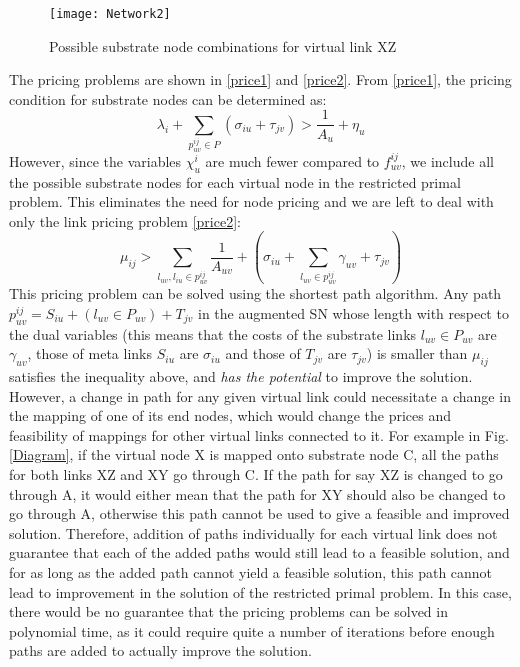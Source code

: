 \documentclass[journal]{IEEEtran}
\begin{document}
\begin{figure}[t]
  {\texttt{[image: Network2]}}
  \caption{Possible substrate node combinations for virtual link XZ}
  \label{Diagram2}
\end{figure}

The pricing problems are shown in \eqref{price1} and \eqref{price2}. From \eqref{price1}, the pricing condition for substrate nodes can be determined as: $$\lambda_i + \sum \limits_{p_{uv}^{ij} \in P} (\sigma_{iu} + \tau_{jv}) > \frac{1}{A_{u}} + \eta_u$$
 However, since the variables $\chi_{u}^{i}$ are much fewer compared to $f_{uv}^{ij}$, we include all the possible substrate nodes for each virtual node in the restricted primal problem. This eliminates the need for node pricing and we are left to deal with only the link pricing problem \eqref{price2}: $$\mu_{ij} > \sum \limits_{ l_{uv}, l_{iu}\in p_{uv}^{ij}} \frac{1}{A_{uv}} + (\sigma_{iu} + \sum \limits_{l_{uv} \in p_{uv}^{ij}}\gamma_{uv} +  \tau_{jv})$$
This pricing problem can be solved using the shortest path algorithm. Any path $p_{uv}^{ij} = S_{iu} + (l_{uv} \in P_{uv}) + T_{jv}$ in the augmented \ac{SN} whose length with respect to the dual variables (this means that the costs of the substrate links $l_{uv} \in P_{uv}$ are $\gamma_{uv}$, those of meta links $S_{iu}$ are $\sigma_{iu}$ and those of $T_{jv}$ are $\tau_{jv}$) is smaller than $\mu_{ij}$ satisfies the inequality above, and \emph{has the potential} to improve the solution.
However, a change in path for any given virtual link could necessitate a change in the mapping of one of its end nodes, which would change the prices and feasibility of mappings for other virtual links connected to it. For example in Fig. \ref{Diagram}, if the virtual node X is mapped onto substrate node C, all the paths for both links XZ and XY go through C. If the path for say XZ is changed to go through A, it would either mean that the path for XY should also be changed to go through A, otherwise this path cannot be used to give a feasible and improved solution. Therefore, addition of paths individually for each virtual link does not guarantee that each of the added paths would still lead to a feasible solution, and for as long as the added path cannot yield a feasible solution, this path cannot lead to improvement in the solution of the restricted primal problem. In this case, there would be no guarantee that the pricing problems can be solved in polynomial time, as it could require quite a number of iterations before enough paths are added to actually improve the solution.
\end{document}

